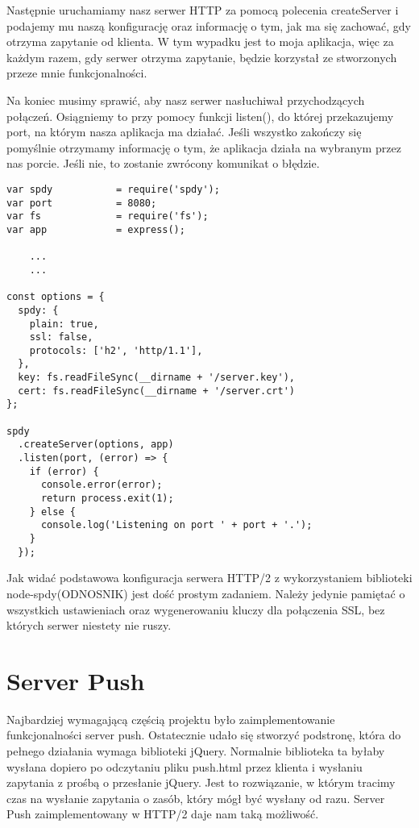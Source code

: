 \documentclass[a4paper,12pt,twoside,openany]{report}
\begin{document}
Następnie uruchamiamy nasz serwer HTTP za pomocą polecenia createServer i podajemy mu naszą konfigurację oraz informację o tym, jak ma się zachować, gdy otrzyma zapytanie od klienta.
W tym wypadku jest to moja aplikacja, więc za każdym razem, gdy serwer otrzyma zapytanie, będzie korzystał ze stworzonych przeze mnie funkcjonalności.

Na koniec musimy sprawić, aby nasz serwer nasłuchiwał przychodzących połączeń.
Osiągniemy to przy pomocy funkcji listen(), do której przekazujemy port, na którym nasza aplikacja ma działać.
Jeśli wszystko zakończy się pomyślnie otrzymamy informację o tym, że aplikacja działa na wybranym przez nas porcie.
Jeśli nie, to zostanie zwrócony komunikat o błędzie.

\begin{lstlisting}
var spdy           = require('spdy');
var port           = 8080;
var fs             = require('fs');
var app            = express();

	...
	...
	
const options = {
  spdy: {
    plain: true,
    ssl: false,
    protocols: ['h2', 'http/1.1'],
  },
  key: fs.readFileSync(__dirname + '/server.key'),
  cert: fs.readFileSync(__dirname + '/server.crt')
};

spdy
  .createServer(options, app)
  .listen(port, (error) => {
    if (error) {
      console.error(error);
      return process.exit(1);
    } else {
      console.log('Listening on port ' + port + '.');
    }
  });
\end{lstlisting}

Jak widać podstawowa konfiguracja serwera HTTP/2 z wykorzystaniem biblioteki node-spdy(ODNOSNIK) jest dość prostym zadaniem.
Należy jedynie pamiętać o wszystkich ustawieniach oraz wygenerowaniu kluczy dla połączenia SSL, bez których serwer niestety nie ruszy.

\section{Server Push}

Najbardziej wymagającą częścią projektu było zaimplementowanie funkcjonalności server push.
Ostatecznie udało się stworzyć podstronę, która do pełnego działania wymaga biblioteki jQuery.
Normalnie biblioteka ta byłaby wysłana dopiero po odczytaniu pliku push.html przez klienta i wysłaniu zapytania z prośbą o przesłanie jQuery.
Jest to rozwiązanie, w którym tracimy czas na wysłanie zapytania o zasób, który mógł być wysłany od razu.
Server Push zaimplementowany w HTTP/2 daje nam taką możliwość.
\end{document}
